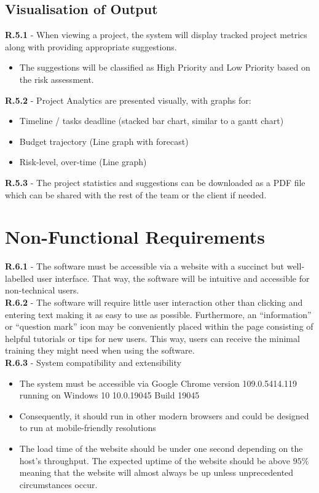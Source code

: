 \documentclass[a4paper]{article}
\theoremstyle{plain}
\theoremstyle{definition}
\theoremstyle{remark}
\begin{document}
\subsection*{Visualisation of Output}
\textbf{R.5.1} - When viewing a project, the system will display tracked project metrics along with providing appropriate suggestions.
\begin{itemize}
	\item The suggestions will be classified as High Priority and Low Priority based on the risk assessment. 
\end{itemize}
\textbf{R.5.2} - Project Analytics are presented visually, with graphs for:
\begin{itemize}
	\item Timeline / tasks deadline (stacked bar chart, similar to a gantt chart)
	\item Budget trajectory (Line graph with forecast)
	\item Risk-level, over-time (Line graph)
\end{itemize}
\textbf{R.5.3} - The project statistics and suggestions can be downloaded as a PDF file which can be shared with the rest of the team or the client if needed.
\section*{Non-Functional Requirements} 
\textbf{R.6.1} - The software must be accessible via a website with a succinct but well-labelled user interface. That way, the software will be intuitive and accessible for non-technical users. \\
\textbf{R.6.2} - The software will require little user interaction other than clicking and entering text making it as easy to use as possible. Furthermore, an “information” or “question mark” icon may be conveniently placed within the page consisting of helpful tutorials or tips for new users. This way, users can receive the minimal training they might need when using the software.\\
\textbf{R.6.3} - System compatibility and extensibility
\begin{itemize}
	\item The system must be accessible via Google Chrome version 109.0.5414.119 running on Windows 10 10.0.19045 Build 19045
	\item Consequently, it should run in other modern browsers and could be designed to run at mobile-friendly resolutions 
	\item The load time of the website should be under one second depending on the host’s throughput. The expected uptime of the website should be above $95\%$ meaning that the website will almost always be up unless unprecedented circumstances occur.
\end{itemize}
\end{document}
